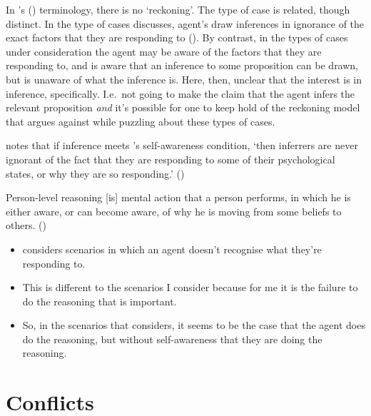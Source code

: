 \documentclass[10pt]{article}
\newcommand{\hozlinedash}[0]{%
  \noindent\hdashrule[0.5ex][c]{\textwidth}{.1pt}{2.5pt}
}
\begin{document}
In \citeauthor{Siegel:2019aa}'s (\citeyear{Siegel:2019aa}) terminology, there is no `reckoning'.
The type of case is related, though distinct.
In the type of cases \citeauthor{Siegel:2019aa} discusses, agent's draw inferences in ignorance of the exact factors that they are responding to (\citeyear[8]{Siegel:2019aa}).
By contrast, in the types of cases under consideration the agent may be aware of the factors that they are responding to, and is aware that an inference to some proposition can be drawn, but is unaware of what the inference is.
Here, then, unclear that the interest is in inference, specifically.
I.e.\ not going to make the claim that the agent infers the relevant proposition \emph{and} it's possible for one to keep hold of the reckoning model that \citeauthor{Siegel:2019aa} argues against while puzzling about these types of cases.

\hozlinedash

\citeauthor{Siegel:2019aa} notes that if inference meets \citeauthor{Boghossian:2014aa}'s self-awareness condition, `then inferrers are never ignorant of the fact that they are responding to some of their psychological states, or why they are so responding.' (\citeyear[6]{Siegel:2019aa})

\begin{description}[font=\bfseries, leftmargin=.75cm, style=nextline]
\item[Self-awareness condition] Person-level reasoning [is] mental action that a person performs, in which he is either aware, or can become aware, of why he is moving from some beliefs to others.\nolinebreak
  \mbox{}\hfill\mbox{(\citeyear[16]{Boghossian:2014aa})}
\end{description}

\begin{itemize}
\item \citeauthor{Siegel:2019aa} considers scenarios in which an agent doesn't recognise what they're responding to.
\item This is different to the scenarios I consider because for me it is the failure to do the reasoning that is important.
\item So, in the scenarios that \citeauthor{Siegel:2019aa} considers, it seems to be the case that the agent does do the reasoning, but without self-awareness that they are doing the reasoning.
\end{itemize}


\section{Conflicts}
\label{sec:conflicts}
\end{document}
